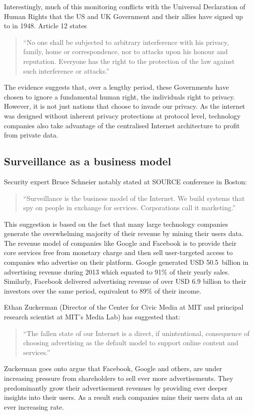 \documentclass[twocolumn,english]{article}
\begin{document}
Interestingly, much of this monitoring conflicts with the Universal
Declaration of Human Rights that the US and UK Government and their
allies have signed up to in 1948. Article 12 states\cite{unhrd12}
\begin{quote}
\textquotedblleft No one shall be subjected to arbitrary interference
with his privacy, family, home or correspondence, nor to attacks upon
his honour and reputation. Everyone has the right to the protection
of the law against such interference or attacks.\textquotedblright
\end{quote}
The evidence suggests that, over a lengthy period, these Governments
have chosen to ignore a fundamental human right, the individuals right
to privacy. However, it is not just nations that choose to invade
our privacy.  As the internet was designed without inherent privacy protections at protocol level, technology companies also take advantage of the centralised Internet architecture to profit from private data.

\subsection{Surveillance as a business model }

Security expert Bruce Schneier notably stated at SOURCE conference in Boston:\cite{boston14}
\begin{quote}
\textquotedblleft Surveillance is the business model of the Internet. We build systems that spy on people in exchange for services. Corporations call it marketing.\textquotedblright
\end{quote}
This suggestion is based on the fact that many large technology
companies generate the overwhelming majority of their revenue by
mining their users data. The revenue model of companies like Google
and Facebook is to provide their core services free from monetary
charge and then sell user-targeted access to companies who advertise on their platform. Google generated USD 50.5~billion in advertising
revenue during 2013 which equated to 91\% of their yearly sales\cite{google13}. Similarly, Facebook delivered advertising revenue of over USD 6.9
billion to their investors over the same period, equivalent to 89\%
of their income\cite{facebook13}. 

Ethan Zuckerman (Director of the Center for Civic Media at MIT and
principal research scientist at MIT\textquoteright s Media Lab) has
suggested that\cite{zuckerman14}:
\begin{quote}
\textquotedblleft The fallen state of our Internet is a direct, if
unintentional, consequence of choosing advertising as the default
model to support online content and services.\textquotedblright 
\end{quote}
Zuckerman goes onto argue that Facebook, Google and others, are under
increasing pressure from shareholders to sell ever more advertisements.
They predominantly grow their advertisement revenues by providing ever deeper insights into their users.  As a result such companies mine their users data at an ever increasing rate.
\end{document}
